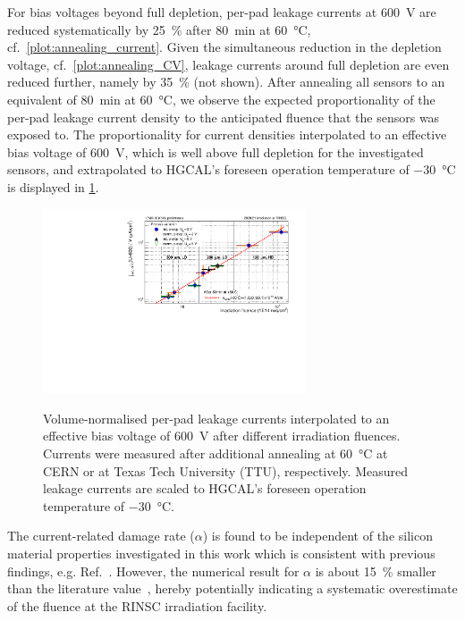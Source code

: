 For bias voltages beyond full depletion, per-pad leakage currents at \SI{600}{\volt} are reduced systematically by \SI{25}{\percent} after \SI{80}{\minute} at \SI{60}{\celsius}, cf.~\ref{plot:annealing_current}.
Given the simultaneous reduction in the depletion voltage, cf.~\ref{plot:annealing_CV}, leakage currents around full depletion are even reduced further, namely by \SI{35}{\percent} (not shown).
After annealing all sensors to an equivalent of \SI{80}{\minute} at \SI{60}{\celsius}, we observe the expected proportionality of the per-pad leakage current density to the anticipated fluence that the sensors was exposed to.
The proportionality for current densities interpolated to an effective bias voltage of \SI{600}{\volt}, which is well above full depletion for the investigated sensors, and extrapolated to HGCAL's foreseen operation temperature of \SI{-30}{\celsius} is displayed in \ref{plot:alpha_600}.
\begin{figure}
	\captionsetup[subfigure]{aboveskip=-1pt,belowskip=-1pt}
	\centering
    \includegraphics[width=0.69\textwidth]{plots/alpha/alpha_600V.pdf}
    \label{plot:alpha_600}
	\caption{
	    Volume-normalised per-pad leakage currents interpolated to an effective bias voltage of \SI{600}{\volt} after different irradiation fluences.
        Currents were measured after additional annealing at \SI{60}{\celsius} at CERN or at Texas Tech University (TTU), respectively.
		Measured leakage currents are scaled to HGCAL's foreseen operation temperature of \SI{-30}{\celsius}.
	}
\end{figure}
The current-related damage rate ($\alpha$) is found to be independent of the silicon material properties investigated in this work which is consistent with previous findings, e.g. Ref.~\cite{MOLL199987}.
However, the numerical result for $\alpha$ is about \SI{15}{\percent} smaller than the literature value~\cite{moll:SiDamages}, hereby potentially indicating a systematic overestimate of the fluence at the RINSC irradiation facility. 
